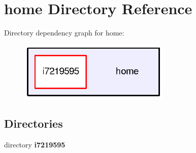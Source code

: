 \section{home Directory Reference}
\label{dir_75b82e7e4a5feb05200b9ad7adf06257}
Directory dependency graph for home\-:\nopagebreak
\begin{figure}[H]
\begin{center}
\leavevmode
\includegraphics[width=204pt]{dir_75b82e7e4a5feb05200b9ad7adf06257_dep}
\end{center}
\end{figure}
\subsection*{Directories}
\begin{DoxyCompactItemize}
\item 
directory {\bf i7219595}
\end{DoxyCompactItemize}
